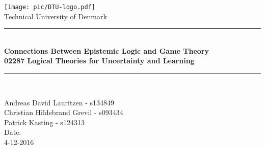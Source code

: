 \begin{titlepage}
\begin{center}
\texttt{[image: pic/DTU-logo.pdf]}\\
\huge Technical University of Denmark
\end{center}
\vspace{-2cm}
\begin{center}
\vspace*{3cm}
\rule{\textwidth}{1mm}\\
\vspace{0.7cm}
\huge\bfseries Connections Between Epistemic Logic and Game Theory\\[2mm]
\Large  02287 Logical Theories for Uncertainty and Learning \\
\vspace{0.3cm}
\rule{\textwidth}{1mm}\\
\vspace{1.2cm}
\vspace{1.5cm}
\end{center}
\begin{center}
\Large Andreas David Lauritzen - s134849\\
\Large Christian Hildebrand Grevil - 	s093434\\
\Large Patrick Kasting - s124313\\
\vspace{5cm}
Date:\\ 4-12-2016
\end{center}
\end{titlepage}